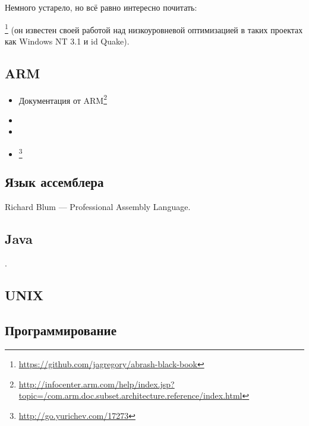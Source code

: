 Немного устарело, но всё равно интересно почитать:

\MAbrash\footnote{\AlsoAvailableAs \url{https://github.com/jagregory/abrash-black-book}}
(он известен своей работой над низкоуровневой оптимизацией в таких проектах как Windows NT 3.1 и id Quake).

\subsection{ARM}

\begin{itemize}
\item Документация от ARM\footnote{\AlsoAvailableAs \url{http://infocenter.arm.com/help/index.jsp?topic=/com.arm.doc.subset.architecture.reference/index.html}}

\item \ARMSevenRef

\item \ARMSixFourRefURL

\item \ARMCookBook\footnote{\AlsoAvailableAs \url{http://go.yurichev.com/17273}}
\end{itemize}

\subsection{Язык ассемблера}

Richard Blum --- Professional Assembly Language.

\subsection{Java}

\JavaBook.

\subsection{UNIX}

\TAOUP

\subsection{Программирование}

